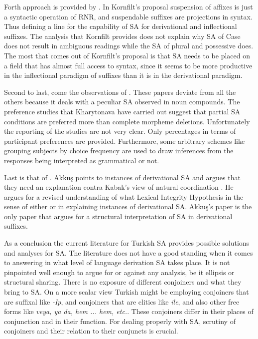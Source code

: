 Forth approach is provided by \cite{kornfilt1996some, kornfilt2012revisiting}. In Kornfilt's proposal suspension of affixes is just a syntactic operation of RNR, and suspendable suffixes are projections in syntax. Thus defining a line for the capability of SA for derivational and inflectional suffixes. The analysis that Kornfilt provides does not explain why SA of Case does not result in ambiguous readings while the SA of plural and possessive does. The most that comes out of Kornfilt's proposal is that SA needs to be placed on a field that has almost full access to syntax, since it seems to be more productive in the inflectional paradigm of suffixes than it is in the derivational paradigm.

Second to last, come the observations of \cite{kharytonava2011morphology,kharytonava2012word,kharytonava2012taming}. These papers deviate from all the others because it deals with a peculiar SA observed in noun compounds. The preference studies that Kharytonava have carried out suggest that partial SA conditions are preferred more than complete morpheme deletions. Unfortunately the reporting of the studies are not very clear. Only percentages in terms of participant preferences are provided. Furthermore, some arbitrary schemes like grouping subjects by choice frequency are used to draw inferences from the responses being interpreted as grammatical or not. 

Last is that of \cite{akkucs2016suspended}. Akkuş points to instances of derivational SA and argues that they need an explanation contra Kabak's view of natural coordination \cite{walchli2005co}. He argues for a revised understanding of what Lexical Integrity Hypothesis in the sense of either \cite{ackema2004beyond} or \cite{lieber2006lexical} in explaining instances of derivational SA. Akkuş's paper is the only paper that argues for a structural interpretation of SA in derivational suffixes. 


As a conclusion the current literature for Turkish SA provides possible solutions and analyses for SA. The literature does not have a good standing when it comes to answering in what level of language derivation SA takes place. It is not pinpointed well enough to argue for or against any analysis, be it ellipsis or structural sharing. There is no exposure of different conjoiners and what they bring to SA. On a more scalar view Turkish might be employing conjoiners that are suffixal like \textit{-Ip}, and conjoiners that are clitics like \textit{ile}, and also other free forms like \textit{veya, ya da, hem ... hem, etc.}. These conjoiners differ in their places of conjunction and in their function. For dealing properly with SA, scrutiny of conjoiners and their relation to their conjuncts is crucial.